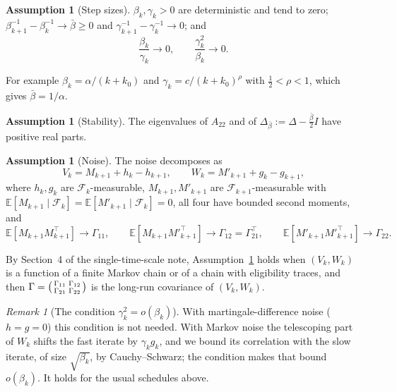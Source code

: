 \documentclass[11pt]{article}
\theoremstyle{definition}
\newtheorem{assumption}[theorem]{Assumption}
\theoremstyle{remark}
\newtheorem{remark}[theorem]{Remark}
\newcommand{\E}{\mathbb{E}}
\newcommand{\F}{\mathcal{F}}
\begin{document}
\begin{assumption}[Step sizes]\label{ass:step}
$\beta_k, \gamma_k > 0$ are deterministic and tend to zero;
$\beta_{k+1}^{-1} - \beta_k^{-1} \to \bar\beta \ge 0$ and $\gamma_{k+1}^{-1} - \gamma_k^{-1} \to 0$;
and
\[
  \frac{\beta_k}{\gamma_k} \to 0,\qquad \frac{\gamma_k^2}{\beta_k} \to 0 .
\]
\end{assumption}

For example $\beta_k = \alpha/(k + k_0)$ and $\gamma_k = c/(k + k_0)^\rho$ with
$\frac12 < \rho < 1$, which gives $\bar\beta = 1/\alpha$.

\begin{assumption}[Stability]\label{ass:stable}
The eigenvalues of $A_{22}$ and of $\Delta_{\bar\beta} := \Delta - \frac{\bar\beta}{2}I$ have positive real
parts.
\end{assumption}

\begin{assumption}[Noise]\label{ass:noise}
The noise decomposes as
\[
  V_k = M_{k+1} + h_k - h_{k+1},\qquad W_k = M'_{k+1} + g_k - g_{k+1},
\]
where $h_k, g_k$ are $\F_k$-measurable, $M_{k+1}, M'_{k+1}$ are $\F_{k+1}$-measurable with
$\E[M_{k+1}\mid\F_k] = \E[M'_{k+1}\mid\F_k] = 0$, all four have bounded second moments, and
\[
  \E[M_{k+1}M_{k+1}^\top] \to \Gamma_{11},\qquad
  \E[M_{k+1}M'^\top_{k+1}] \to \Gamma_{12} = \Gamma_{21}^\top,\qquad
  \E[M'_{k+1}M'^\top_{k+1}] \to \Gamma_{22}.
\]
\end{assumption}

By Section~4 of the single-time-scale note, Assumption~\ref{ass:noise} holds when $(V_k, W_k)$
is a function of a finite Markov chain or of a chain with eligibility traces, and then
$\Gamma = \begin{psmallmatrix}\Gamma_{11} & \Gamma_{12}\\ \Gamma_{21} & \Gamma_{22}\end{psmallmatrix}$ is the
long-run covariance of $(V_k, W_k)$.

\begin{remark}[The condition $\gamma_k^2 = o(\beta_k)$]\label{rem:gamma2}
With martingale-difference noise ($h = g = 0$) this condition is not needed. With Markov
noise the telescoping part of $W_k$ shifts the fast iterate by $\gamma_kg_k$, and we bound its
correlation with the slow iterate, of size $\sqrt{\beta_k}$, by Cauchy--Schwarz; the
condition makes that bound $o(\beta_k)$. It holds for the usual schedules above.
\end{remark}

\end{document}

